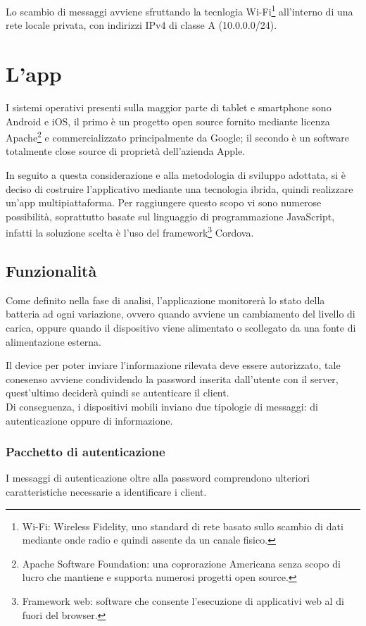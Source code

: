 \documentclass[target=bach]{thud}
\begin{document}
    Lo scambio di messaggi avviene sfruttando la tecnlogia Wi-Fi\footnote[1]{Wi-Fi: Wireless Fidelity, uno standard di rete basato sullo scambio di dati mediante onde radio e quindi assente da un canale fisico.} all'interno di una rete locale privata, con indirizzi IPv4 di classe A (10.0.0.0/24).

    \section{L'app}

        I sistemi operativi presenti sulla maggior parte di tablet e smartphone sono Android e iOS, il primo è un progetto open source fornito mediante licenza Apache\footnote[2]{Apache Software Foundation: una coprorazione Americana senza scopo di lucro che mantiene e supporta numerosi progetti open source.} e commercializzato principalmente da Google; il secondo è un software totalmente close source di proprietà dell'azienda Apple.

        In seguito a questa considerazione e alla metodologia di sviluppo adottata, si è deciso di costruire l'applicativo mediante una tecnologia ibrida, quindi realizzare un'app multipiattaforma. Per raggiungere questo scopo vi sono numerose possibilità, soprattutto basate sul linguaggio di programmazione JavaScript, infatti la soluzione scelta è l'uso del framework\footnote[3]{Framework web: software che consente l'esecuzione di applicativi web al di fuori del browser.} Cordova.


    \subsection{Funzionalità}

        Come definito nella fase di analisi, l'applicazione monitorerà lo stato della batteria ad ogni variazione, ovvero quando avviene un cambiamento del livello di carica, oppure quando il dispositivo viene alimentato o scollegato da una fonte di alimentazione esterna.

        Il device per poter inviare l'informazione rilevata deve essere autorizzato, tale conesenso avviene condividendo la password inserita dall'utente con il server, quest'ultimo deciderà quindi se autenticare il client.\\
        Di conseguenza, i dispositivi mobili inviano due tipologie di messaggi: di autenticazione oppure di informazione.

    \subsubsection{Pacchetto di autenticazione}
        I messaggi di autenticazione oltre alla password comprendono ulteriori caratteristiche necessarie a identificare i client.
\end{document}
